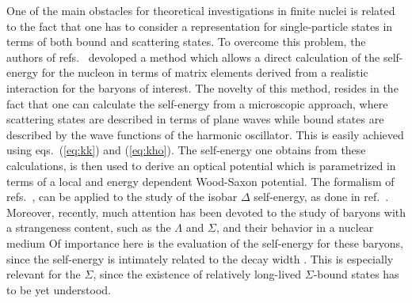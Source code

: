 \begin{itemize}
One of the main obstacles for theoretical investigations
in finite
nuclei is related to the fact that one has to consider
a representation for 
single-particle
states in terms of both bound and scattering states. 
To overcome this problem, the authors of refs.\
\cite{bon89,bbmp92,hbmp93} devoloped a method which allows a
direct calculation of the self-energy for the nucleon in terms
of matrix elements derived from a realistic interaction for the
baryons of interest. 
The novelty of this method, resides in
the fact that one can calculate the self-energy from a
microscopic approach, where scattering states are described in terms
of plane waves while bound states are described by the wave functions
of the harmonic oscillator.
This is easily achieved using eqs.\ (\ref{eq:kk}) and (\ref{eq:kho}).
The self-energy one  obtains from these
calculations, is then
used to derive an optical potential which is
parametrized in terms of a local and energy dependent Wood-Saxon potential.
The formalism of refs.\ \cite{bon89,bbmp92,hbmp93}, can be applied
to the study of the isobar $\Delta$ self-energy, as done
in ref.\ \cite{hmp93}.
Moreover, recently, much attention has been devoted
to the study of baryons with a strangeness content,
such as the
$\Lambda$ and $\Sigma$, and their behavior in a nuclear
medium
Of importance here is the evaluation of the self-energy for these
baryons, since the self-energy is intimately related to the
decay width \cite{ossigma}.
This is especially relevant for the $\Sigma$, since the existence
of relatively long-lived $\Sigma$-bound states has to be yet
understood.




\end{itemize}
